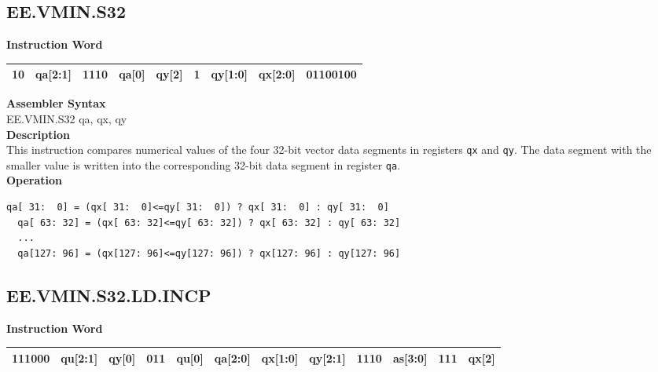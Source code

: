 \clearpage
\subsection{EE.VMIN.S32}\label{instruction:EEVMINS32}
\setlength\tabcolsep{6pt}
\textbf{Instruction Word} \\
\begin{tabular}{|c|c|c|c|c|c|c|c|c|}
	\hline
	10 & qa[2:1] & 1110 & qa[0] & qy[2] & 1 & qy[1:0] & qx[2:0] & 01100100 \\
	\hline
\end{tabular}

\textbf{Assembler Syntax} \\
EE.VMIN.S32 qa, qx, qy \\
\textbf{Description} \\
This instruction compares numerical values of the four 32-bit vector data segments in registers \lstinline{qx} and \lstinline{qy}. The data segment with the smaller value is written into the corresponding 32-bit data segment in register \lstinline{qa}.\\
\textbf{Operation}
\begin{lstlisting}[escapeinside=`?]
  qa[ 31:  0] = (qx[ 31:  0]<=qy[ 31:  0]) ? qx[ 31:  0] : qy[ 31:  0]
  qa[ 63: 32] = (qx[ 63: 32]<=qy[ 63: 32]) ? qx[ 63: 32] : qy[ 63: 32]
  ...
  qa[127: 96] = (qx[127: 96]<=qy[127: 96]) ? qx[127: 96] : qy[127: 96]
\end{lstlisting}

\clearpage
\subsection{EE.VMIN.S32.LD.INCP}\label{instruction:EEVMINS32LDINCP}
\setlength\tabcolsep{6pt}
\textbf{Instruction Word} \\
\begin{tabular}{|c|c|c|c|c|c|c|c|c|c|c|c|}
	\hline
	111000 & qu[2:1] & qy[0] & 011 & qu[0] & qa[2:0] & qx[1:0] & qy[2:1] & 1110 & as[3:0] & 111 & qx[2] \\
	\hline
\end{tabular}

